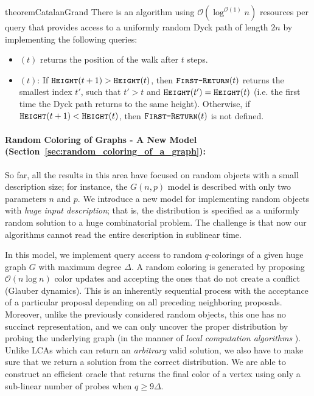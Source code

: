 \begin{restatable}{theorem}{CatalanGrand}
\label{thm:catalan_main}
There is an algorithm using $\mathcal O(\log^{\mathcal O(1)} n)$ resources per query that provides access to
a uniformly random Dyck path of length $2n$ by implementing the following queries:
\begin{itemize}
    \item {}$(t)$ returns the position of the walk after $t$ steps.
    \item {}$(t)$: If $\texttt{\textsc{Height}}(t+1) > \texttt{\textsc{Height}}(t)$, then $\texttt{\textsc{First-Return}}(t)$ returns the smallest index $t'$,
    such that $t'>t$ and $\texttt{\textsc{Height}}(t') = \texttt{\textsc{Height}}(t)$ (i.e. the first time the Dyck path returns to the same height).
    Otherwise, if $\texttt{\textsc{Height}}(t+1) < \texttt{\textsc{Height}}(t)$, then $\texttt{\textsc{First-Return}}(t)$ is not defined.
\end{itemize}
\end{restatable}




\paragraph*{Random Coloring of Graphs - A New Model (Section~\ref{sec:random_coloring_of_a_graph}):}%
\label{par:random_coloring_of_graphs}
So far, all the results in this area have focused on random objects with a small description size;
for instance, the $G(n, p)$ model is described with only two parameters $n$ and $p$.
We introduce a new model for implementing random objects with \emph{huge input description};
that is, the distribution is specified as a uniformly random solution to a huge combinatorial problem.
The challenge is that now our algorithms cannot read the entire description in sublinear time.

In this model, we implement query access to random $q$-colorings of a given huge graph $G$ with maximum degree $\Delta$.
A random coloring is generated by proposing $\mathcal O(n\log n)$ color updates and accepting the ones that do not create a conflict (Glauber dynamics).
This is an inherently sequential process with the acceptance of a particular proposal depending on all preceding neighboring proposals.
Moreover, unlike the previously considered random objects, this one has no succinct representation, and we can only uncover the proper distribution
by probing the underlying graph (in the manner of \emph{local computation algorithms} \cite{LCA, LCA_space_efficient}).
Unlike LCAs which can return an \emph{arbitrary} valid solution, we also have to make sure that we return a solution from the correct distribution.
We are able to construct an efficient oracle that returns the final color of a vertex using only a sub-linear number of probes when $q\ge 9\Delta$.

